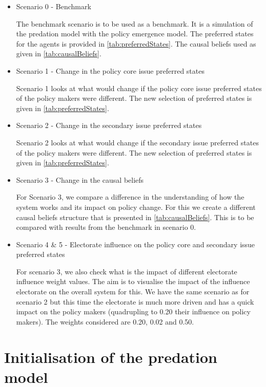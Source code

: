 \documentclass[12pt]{article}
\begin{document}
\begin{itemize}
\item Scenario 0 - Benchmark

The benchmark scenario is to be used as a benchmark. It is a simulation of the predation model with the policy emergence model. The preferred states for the agents is provided in \autoref{tab:preferredStates}. The causal beliefs used as given in \autoref{tab:causalBeliefs}.

\item Scenario 1 - Change in the policy core issue preferred states

Scenario 1 looks at what would change if the policy core issue preferred states of the policy makers were different. The new selection of preferred states is given in \autoref{tab:preferredStates}.

\item Scenario 2 - Change in the secondary issue preferred states

Scenario 2 looks at what would change if the secondary issue preferred states of the policy makers were different. The new selection of preferred states is given in \autoref{tab:preferredStates}.

\item Scenario 3 - Change in the causal beliefs

For Scenario 3, we compare a difference in the understanding of how the system works and its impact on policy change. For this we create a different causal beliefs structure that is presented in \autoref{tab:causalBeliefs}. This is to be compared with results from the benchmark in scenario 0.

\item Scenario 4 \& 5 - Electorate influence on the policy core and secondary issue preferred states

For scenario 3, we also check what is the impact of different electorate influence weight values. The aim is to visualise the impact of the influence electorate on the overall system for this. We have the same scenario as for scenario 2 but this time the electorate is much more driven and has a quick impact on the policy makers (quadrupling to 0.20 their influence on policy makers). The weights considered are 0.20, 0.02 and 0.50.

\end{itemize}


\section{Initialisation of the predation model}
\label{sec:predation_initialisation}
\end{document}

